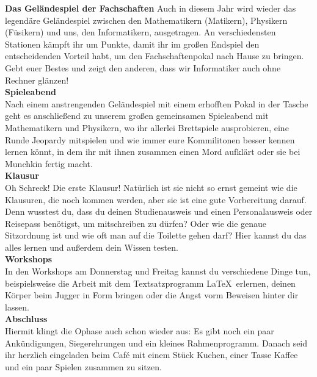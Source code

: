 {\noindent\textbf{Das Geländespiel der Fachschaften}
Auch in diesem Jahr wird wieder das legendäre Geländespiel zwischen den Mathematikern (Matikern), Physikern (Füsikern) und uns, den Informatikern, ausgetragen. An verschiedensten Stationen kämpft ihr um Punkte, damit ihr im großen Endspiel den entscheidenden Vorteil habt, um den Fachschaftenpokal nach Hause zu bringen. Gebt euer Bestes und zeigt den anderen, dass wir Informatiker auch ohne Rechner glänzen!\\

\noindent\textbf{Spieleabend}\\
Nach einem anstrengenden Geländespiel mit einem erhofften Pokal in der Tasche geht es anschließend zu unserem großen gemeinsamen Spieleabend mit Mathematikern und Physikern, wo ihr allerlei Brettspiele ausprobieren, eine Runde Jeopardy mitspielen und wie immer eure Kommilitonen besser kennen lernen könnt, in dem ihr mit ihnen zusammen einen Mord aufklärt oder sie bei Munchkin fertig macht. \\


\noindent\textbf{Klausur}\\
Oh Schreck! Die erste Klausur! Natürlich ist sie nicht so ernst gemeint wie die Klausuren, die noch kommen werden, aber sie ist eine gute Vorbereitung darauf. Denn wusstest du, dass du deinen Studienausweis und einen Personalausweis oder Reisepass benötigst, um mitschreiben zu dürfen? Oder wie die genaue Sitzordnung ist und wie oft man auf die Toilette gehen darf? Hier kannst du das alles lernen und außerdem dein Wissen testen.\\


\noindent\textbf{Workshops}\\
In den Workshops am Donnerstag und Freitag kannst du verschiedene Dinge tun, beispielsweise die Arbeit mit dem Textsatzprogramm \LaTeX~erlernen, deinen Körper beim Jugger in Form bringen oder die Angst vorm Beweisen hinter dir lassen.\\

\noindent\textbf{Abschluss}\\
Hiermit klingt die Ophase auch schon wieder aus: Es gibt noch ein paar Ankündigungen, Siegerehrungen und ein kleines Rahmenprogramm. Danach seid ihr herzlich eingeladen beim Caf\'e mit einem Stück Kuchen, einer Tasse Kaffee und ein paar Spielen zusammen zu sitzen.
}{}

\newpage
